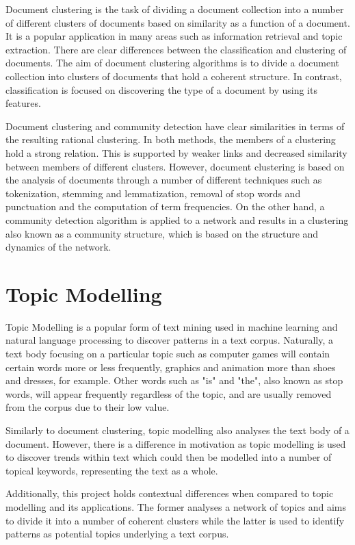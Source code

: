 Document clustering is the task of dividing a document collection into a number of different clusters of documents based on similarity as a function of a document. It is a popular application in many areas such as information retrieval and topic extraction. There are clear differences between the classification and clustering of documents. The aim of document clustering algorithms is to divide a document collection into clusters of documents that hold a coherent structure. In contrast, classification is focused on discovering the type of a document by using its features.

Document clustering and community detection have clear similarities in terms of the resulting rational clustering. In both methods, the members of a clustering hold a strong relation. This is supported by weaker links and decreased similarity between members of different clusters. However, document clustering is based on the analysis of documents through a number of different techniques such as tokenization, stemming and lemmatization, removal of stop words and punctuation and the computation of term frequencies. On the other hand, a community detection algorithm is applied to a network and results in a clustering also known as a community structure, which is based on the structure and dynamics of the network.

\section{Topic Modelling}

Topic Modelling is a popular form of text mining used in machine learning and natural language processing to discover patterns in a text corpus. Naturally, a text body focusing on a particular topic such as computer games will contain certain words more or less frequently, graphics and animation more than shoes and dresses, for example. Other words such as "is" and "the", also known as stop words, will appear frequently regardless of the topic, and are usually removed from the corpus due to their low value.

Similarly to document clustering, topic modelling also analyses the text body of a document. However, there is a difference in motivation as topic modelling is used to discover trends within text which could then be modelled into a number of topical keywords, representing the text as a whole. 

Additionally, this project holds contextual differences when compared to topic modelling and its applications. The former analyses a network of topics and aims to divide it into a number of coherent clusters while the latter is used to identify patterns as potential topics underlying a text corpus.